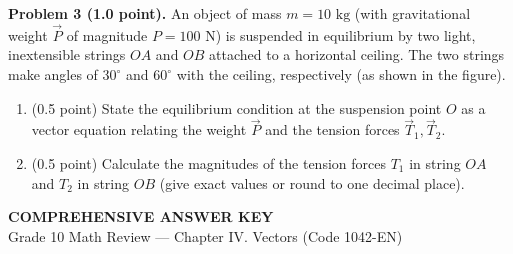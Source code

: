 \documentclass[10pt,a4paper]{article}
\begin{document}
\vspace{6pt}
\textbf{Problem 3 (1.0 point).} An object of mass $m = 10\text{ kg}$ (with gravitational weight $\vec{P}$ of magnitude $P = 100\text{ N}$) is suspended in equilibrium by two light, inextensible strings $OA$ and $OB$ attached to a horizontal ceiling. The two strings make angles of $30^\circ$ and $60^\circ$ with the ceiling, respectively (as shown in the figure).
\par\noindent\begin{minipage}[t]{0.70\linewidth}
\begin{enumerate}[label=\alph*), leftmargin=0.6cm, itemsep=2pt]
    \item (0.5 point) State the equilibrium condition at the suspension point $O$ as a vector equation relating the weight $\vec{P}$ and the tension forces $\vec{T}_1, \vec{T}_2$.
    \item (0.5 point) Calculate the magnitudes of the tension forces $T_1$ in string $OA$ and $T_2$ in string $OB$ (give exact values or round to one decimal place).
\end{enumerate}
\end{minipage}\hfill
\begin{minipage}[t]{0.28\linewidth}\raggedleft\vspace{-15pt}
\end{minipage}


\newpage
\pagestyle{dapan}
\setcounter{page}{1}

\begin{center}
  {\Large\bfseries\color{ink} COMPREHENSIVE ANSWER KEY}\\[2pt]
  {\small\color{gray!75!black} Grade 10 Math Review — Chapter IV. Vectors (Code 1042-EN)}
\end{center}
\vspace{1pt}
\end{document}
